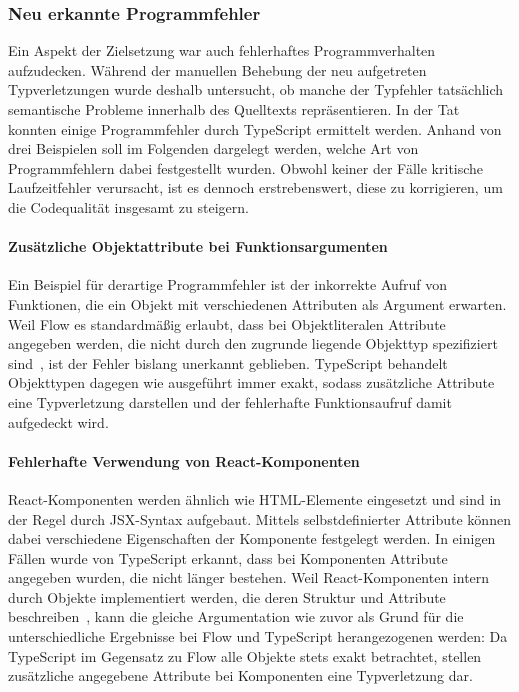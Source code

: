 \subsubsection{Neu erkannte Programmfehler}

Ein Aspekt der Zielsetzung war auch fehlerhaftes Programmverhalten aufzudecken. Während der manuellen Behebung der neu aufgetreten Typverletzungen wurde deshalb untersucht, ob manche der Typfehler tatsächlich semantische Probleme innerhalb des Quelltexts repräsentieren. In der Tat konnten einige Programmfehler durch TypeScript ermittelt werden. Anhand von drei Beispielen soll im Folgenden dargelegt werden, welche Art von Programmfehlern dabei festgestellt wurden. Obwohl keiner der Fälle kritische Laufzeitfehler verursacht, ist es dennoch erstrebenswert, diese zu korrigieren, um die Codequalität insgesamt zu steigern.

\vspace{-0.5\baselineskip}
\paragraph{Zusätzliche Objektattribute bei Funktionsargumenten}
Ein Beispiel für derartige Programmfehler ist der inkorrekte Aufruf von Funktionen, die ein Objekt mit verschiedenen Attributen als Argument erwarten. Weil Flow es standardmäßig erlaubt, dass bei Objektliteralen Attribute angegeben werden, die nicht durch den zugrunde liegende Objekttyp spezifiziert sind~\autocite{FLOW:WIDTH_SUBTYPING}, ist der Fehler bislang unerkannt geblieben. TypeScript behandelt Objekttypen dagegen wie ausgeführt immer exakt, sodass zusätzliche Attribute eine Typverletzung darstellen und der fehlerhafte Funktionsaufruf damit aufgedeckt wird.

\vspace{-0.5\baselineskip}
\paragraph{Fehlerhafte Verwendung von React-Komponenten}
React-Komponenten werden ähnlich wie HTML-Elemente eingesetzt und sind in der Regel durch JSX-Syntax aufgebaut. Mittels selbstdefinierter Attribute können dabei verschiedene Eigenschaften der Komponente festgelegt werden. In einigen Fällen wurde von TypeScript erkannt, dass bei Komponenten Attribute angegeben wurden, die nicht länger bestehen. Weil React-Komponenten intern durch Objekte implementiert werden, die deren Struktur und Attribute beschreiben~\autocite{REACT:REACT_ELEMENTS}, kann die gleiche Argumentation wie zuvor als Grund für die unterschiedliche Ergebnisse bei Flow und TypeScript herangezogenen werden: Da TypeScript im Gegensatz zu Flow alle Objekte stets exakt betrachtet, stellen zusätzliche angegebene Attribute bei Komponenten eine Typverletzung dar.

